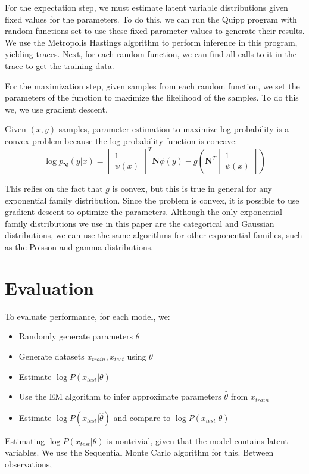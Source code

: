 \documentclass{article}
\begin{document}
    For the expectation step, we must estimate latent variable distributions given
    fixed values for the parameters.  To do this, we can run the Quipp program
    with random functions set to use these fixed parameter values to generate their results.
    We use the Metropolis Hastings algorithm to perform inference in this program,
    yielding traces.  Next, for each random function, we can find all calls
    to it in the trace to get the training data.

    For the maximization step, given samples from each random function, we set the
    parameters of the function to maximize the likelihood of the samples.  To do this we,
    we use gradient descent.

    Given $(x, y)$ samples, parameter estimation to maximize log probability is a convex
    problem because the log probability function is concave:
    $$\log p_{\mathbf{N}}(y | x) = \begin{bmatrix} 1 \\ \psi(x) \end{bmatrix} ^T \mathbf{N} \phi(y) - g\left(\mathbf{N}^T \begin{bmatrix} 1 \\ \psi(x) \end{bmatrix}\right)$$

    This relies on the fact that $g$ is convex, but this is true in general for any exponential family distribution.
    Since the problem is convex, it is possible to use gradient descent to optimize the parameters.  Although
    the only exponential family distributions we use in this paper are the categorical and Gaussian distributions,
    we can use the same algorithms for other exponential families, such as the Poisson and gamma distributions.

  \section{Evaluation}

    To evaluate performance, for each model, we:
    \begin{itemize}
      \item
        Randomly generate parameters $\theta$
      \item
        Generate datasets $x_{train}, x_{test}$ using $\theta$
      \item
        Estimate $\log P(x_{test} | \theta)$
      \item
        Use the EM algorithm to infer approximate parameters $\hat{\theta}$ from $x_{train}$
      \item
        Estimate $\log P(x_{test} | \hat{\theta})$ and compare to $\log P(x_{test} | \theta)$
    \end{itemize}
    Estimating $\log P(x_{test} | \theta)$ is nontrivial, given that the model contains latent variables.
    We use the Sequential Monte Carlo algorithm for this.  Between observations,
\end{document}
